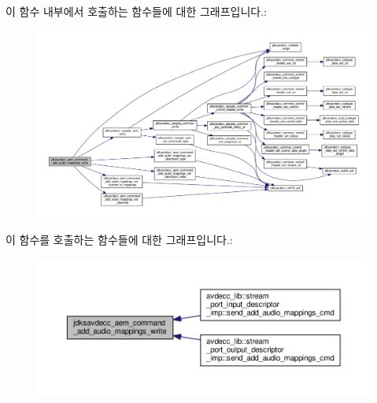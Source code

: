 이 함수 내부에서 호출하는 함수들에 대한 그래프입니다.\+:
\nopagebreak
\begin{figure}[H]
\begin{center}
\leavevmode
\includegraphics[width=350pt]{group__command__add__audio__mappings_ga406afad9c22c864d81b8737f39eaf2cc_cgraph}
\end{center}
\end{figure}




이 함수를 호출하는 함수들에 대한 그래프입니다.\+:
\nopagebreak
\begin{figure}[H]
\begin{center}
\leavevmode
\includegraphics[width=350pt]{group__command__add__audio__mappings_ga406afad9c22c864d81b8737f39eaf2cc_icgraph}
\end{center}
\end{figure}


